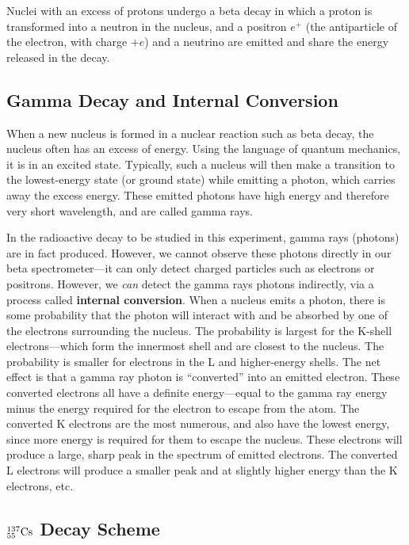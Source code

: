 \documentclass{article}
\newcommand{\cs}{${}^{137}_{55}{\rm Cs}$ }
\begin{document}
Nuclei with an excess of protons undergo a beta decay in which a
proton is transformed into a neutron in the nucleus, and a positron
$e^+$ (the antiparticle of the
electron, with charge $+e$) and a neutrino are emitted and share the
energy released in the decay.


\subsection{Gamma Decay and Internal Conversion}


When a new nucleus is formed in a nuclear reaction such as beta decay,
the nucleus often has an excess of energy.  Using the language of
quantum mechanics, it is in an excited state.  Typically, such a
nucleus will then make a transition to the lowest-energy state  (or
ground state) while emitting a photon, which carries away the excess
energy.  These emitted photons have high energy and therefore very
short wavelength, and are called gamma rays.


In the radioactive decay to be studied in this experiment, gamma
rays (photons) are in fact produced.  However, we cannot observe these
photons directly in our beta spectrometer---it can only detect charged
particles such as electrons or positrons.  However, we
{\em can} detect the gamma rays photons indirectly, via a
process called {\bf internal conversion}.  When a nucleus
emits a photon, there is some probability that the photon will interact with and
be absorbed by one of the electrons surrounding the nucleus.  The
probability is largest for the K-shell electrons---which form the
innermost shell and are closest to the nucleus.  The probability is
smaller for electrons in the L and higher-energy shells.  The net
effect is that a gamma ray photon is
``converted'' into an emitted electron.
 These converted electrons all have a definite energy---equal to the
gamma ray energy minus the energy required for the electron to escape
from the atom.  The converted K electrons are the most numerous, and
also have the lowest energy, since more energy is required for them to
escape the nucleus.  These electrons will produce a large, sharp
peak in the spectrum of emitted electrons.  The converted L electrons
will produce a smaller peak and at slightly higher energy than the K
electrons, etc.


\subsection{\cs Decay Scheme}
\end{document}
